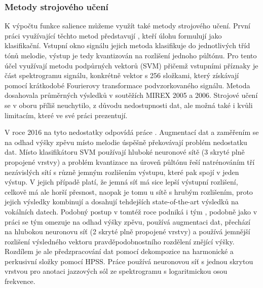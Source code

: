 
\subsubsection{Metody strojového učení}

K výpočtu funkce salience můžeme využít také metody strojového učení. První práci využívající těchto metod představují \cite{Poliner}, kteří úlohu formulují jako klasifikační. Vstupní okno signálu jejich metoda klasifikuje do jednotlivých tříd tónů melodie, výstup je tedy kvantizován na rozlišení jednoho půltónu. Pro tento účel využívají metodu podpůrných vektorů (SVM) přičemž vstupními příznaky je část spektrogramu signálu, konkrétně vektor s 256 složkami, který získávají pomocí krátkodobé Fourierovy transformace podvzorkovaného signálu. Metoda dosahovala průměrných výsledků v soutěžích MIREX 2005 a 2006. Strojové učení se v oboru příliš neuchytilo, z důvodu nedostupnosti dat, ale možná také i kvůli limitacím, které \cite{Poliner} ve své práci prezentují.

V roce 2016 na tyto nedostatky odpovídá práce \cite{Kum2016}. Augmentací dat a zaměřením se na odhad výšky zpěvu místo melodie úspěšně překovávají problém nedostatku dat. Místo klasifikátoru SVM používají hluboké neuronové sítě (3 skryté plně propojené vrstvy) a problém kvantizace na úroveň půltónu řeší natrénováním tří nezávislých sítí s různě jemným rozlišením výstupu, které pak spojí v jeden výstup. V jejich případě platí, že jemná síť má sice lepší výstupní rozlišení, celkově má ale horší přesnost, naopak je tomu u sítě s hrubým rozlišením, proto jejich výsledky kombinují a dosahují tehdejších state-of-the-art výsledků na vokálních datech. Podobný postup v tomtéž roce podniká i tým \cite{Rigaud2016}, podobně jako v práci \cite{Kum2016} se tým omezuje na odhad výšky zpěvu, používá augmentaci dat, přechází na hlubokou neuronovu síť (2 skryté plně propojené vrstvy) a používá jemnější rozlišení výsledného vektoru pravděpodobnostního rozdělení znějící výšky. Rozdílem je ale předzpracování dat pomocí dekompozice na harmonické a perkusivní složky pomocí HPSS. Práce \cite{Balke2017} používá neuronovou síť s jednou skrytou vrstvou pro anotaci jazzových sól ze spektrogramu s logaritmickou osou frekvence. 


